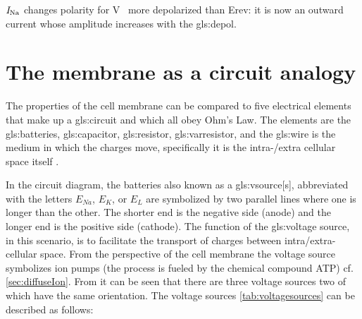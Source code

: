 \documentclass[class={myRUCProject}, crop=false]{standalone}
\begin{document}
\(\mathit{I}_\mathrm{Na}\) changes polarity for \unit{\V\membrane} more depolarized than Erev: it is now an outward current whose amplitude increases with the \gls{gls:depol}.




\section{The membrane as a circuit analogy}


The properties of the cell membrane can be compared to five electrical elements that make up a \gls{gls:circuit} and which all obey Ohm's Law. The elements are the \gls{gls:batteries}, \gls{gls:capacitor}, \gls{gls:resistor}, \gls{gls:varresistor}, and the \gls{gls:wire} is the medium in which the charges move, specifically it is the intra-/extra cellular space itself .

In the circuit diagram, the batteries also known as a \gls{gls:vsource}[s], abbreviated with the letters $E_{Na}$, $E_K$, or $E_L$ are symbolized by two parallel lines where one is longer than the other. The shorter end is the negative side (anode) and the longer end is the positive side (cathode). The function of the \gls{gls:voltage} source, in this scenario, is to facilitate the transport of charges between intra/extra-cellular space. From the perspective of the cell membrane the voltage source symbolizes ion pumps (the process is fueled by the chemical compound ATP) cf. \cref{sec:diffuseIon}. From  it can be seen that there are three voltage sources two of which have the same orientation. The voltage sources \cref{tab:voltagesources} can be described as follows:
\end{document}
